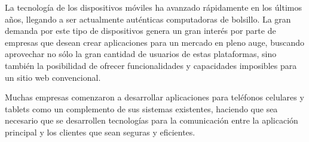 La tecnología de los dispositivos móviles ha avanzado rápidamente en los últimos años, llegando a ser actualmente auténticas computadoras de bolsillo. La gran demanda por este tipo de dispositivos genera un gran interés por parte de empresas que desean crear aplicaciones para un mercado en pleno auge, buscando aprovechar no sólo la gran cantidad de usuarios de estas plataformas, sino también la posibilidad de ofrecer funcionalidades y capacidades imposibles para un sitio web convencional.

Muchas empresas comenzaron a desarrollar aplicaciones para teléfonos celulares y tablets como un complemento de sus sistemas existentes, haciendo que sea necesario que se desarrollen tecnologías para la comunicación entre la aplicación principal y los clientes que sean seguras y eficientes.


